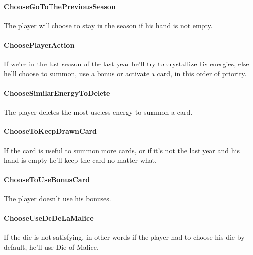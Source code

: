 \begin{appendices}
    \paragraph{ChooseGoToThePreviousSeason}
    The player will choose to stay in the season if his hand is not empty.

    \paragraph{ChoosePlayerAction}
    If we're in the last season of the last year he'll try to crystallize his energies, else he'll choose to summon, use a bonus or activate a card, in this order of priority.
    
    \paragraph{ChooseSimilarEnergyToDelete}
    The player deletes the most useless energy to summon a card.
    
    \paragraph{ChooseToKeepDrawnCard}
    If the card is useful to summon more cards, or if it's not the last year and his hand is empty he'll keep the card no matter what.
    
    \paragraph{ChooseToUseBonusCard}
    The player doesn't use his bonuses.
    
    \paragraph{ChooseUseDeDeLaMalice}
    If the die is not satisfying, in other words if the player had to choose his die by default, he'll use Die of Malice.

\end{appendices}
